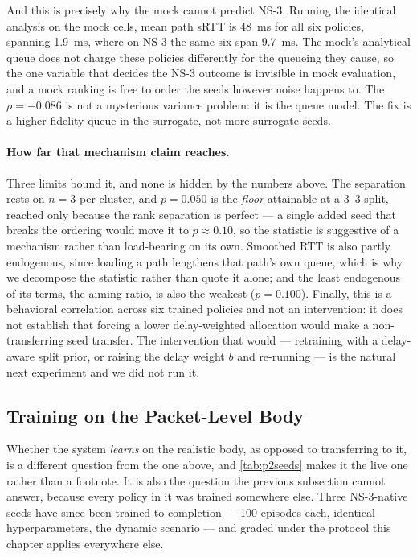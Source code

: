 And this is precisely why the mock cannot predict NS-3. Running the identical analysis on the mock
cells, mean path sRTT is \SI{48}{\milli\second} for all six policies, spanning \SI{1.9}{\milli\second},
where on NS-3 the same six span \SI{9.7}{\milli\second}. The mock's analytical queue does not charge
these policies differently for the queueing they cause, so the one variable that decides the NS-3
outcome is invisible in mock evaluation, and a mock ranking is free to order the seeds however noise
happens to. The $\rho = -0.086$ is not a mysterious variance problem: it is the queue model. The fix is
a higher-fidelity queue in the surrogate, not more surrogate seeds.

\paragraph{How far that mechanism claim reaches.} Three limits bound it, and none is hidden by the
numbers above. The separation rests on $n = 3$ per cluster, and $p = 0.050$ is the \emph{floor}
attainable at a 3--3 split, reached only because the rank separation is perfect --- a single added seed
that breaks the ordering would move it to $p \approx 0.10$, so the statistic is suggestive of a
mechanism rather than load-bearing on its own. Smoothed RTT is also partly endogenous, since loading a
path lengthens that path's own queue, which is why we decompose the statistic rather than quote it
alone; and the least endogenous of its terms, the aiming ratio, is also the weakest ($p = 0.100$).
Finally, this is a behavioral correlation across six trained policies and not an intervention: it does
not establish that forcing a lower delay-weighted allocation would make a non-transferring seed
transfer. The intervention that would --- retraining with a delay-aware split prior, or raising the
delay weight $b$ and re-running --- is the natural next experiment and we did not run it.

\subsection{Training on the Packet-Level Body}
\label{sec:p2eval:ns3native}

Whether the system \emph{learns} on the realistic body, as opposed to transferring to it, is a different
question from the one above, and \cref{tab:p2seeds} makes it the live one rather than a footnote. It is
also the question the previous subsection cannot answer, because every policy in it was trained
somewhere else. Three NS-3-native seeds have since been trained to completion --- 100 episodes each,
identical hyperparameters, the dynamic scenario --- and graded under the protocol this chapter applies
everywhere else.

